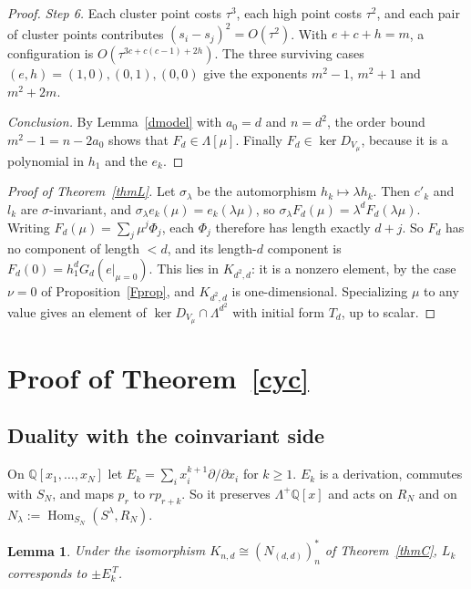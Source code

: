 \documentclass[11pt]{article}
\newtheorem{lemma}[theorem]{Lemma}
\theoremstyle{definition}
\theoremstyle{remark}
\newcommand{\Q}{\mathbb{Q}}
\newcommand{\La}{\Lambda}
\newcommand{\Hom}{\operatorname{Hom}}
\begin{document}
\begin{proof}
\emph{Step 6.} Each cluster point costs $\tau^3$, each high point costs $\tau^2$, and each pair of cluster points
contributes $(s_i-s_j)^2=O(\tau^2)$. With $e+c+h=m$, a configuration is $O(\tau^{3c+c(c-1)+2h})$. The three
surviving cases $(e,h)=(1,0),(0,1),(0,0)$ give the exponents $m^2-1$, $m^2+1$ and $m^2+2m$.

\emph{Conclusion.} By Lemma~\ref{dmodel} with $a_0=d$ and $n=d^2$, the order bound $m^2-1=n-2a_0$ shows that
$F_d\in\La[\mu]$. Finally $F_d\in\ker D_{V_\mu}$, because it is a polynomial in $h_1$ and the $e_k$.
\end{proof}

\begin{proof}[Proof of Theorem~\ref{thmL}]
Let $\sigma_\lambda$ be the automorphism $h_k\mapsto\lambda h_k$. Then $c'_k$ and $l_k$ are $\sigma$-invariant, and
$\sigma_\lambda e_k(\mu)=e_k(\lambda\mu)$, so $\sigma_\lambda F_d(\mu)=\lambda^dF_d(\lambda\mu)$. Writing
$F_d(\mu)=\sum_j\mu^j\Phi_j$, each $\Phi_j$ therefore has length exactly $d+j$. So $F_d$ has no component of length
$<d$, and its length-$d$ component is $F_d(0)=h_1^dG_d(e|_{\mu=0})$. This lies in $K_{d^2,d}$: it is a nonzero
element, by the case $\nu=0$ of Proposition~\ref{Fprop}, and $K_{d^2,d}$ is one-dimensional. Specializing $\mu$ to
any value gives an element of $\ker D_{V_\mu}\cap\La^{d^2}$ with initial form $T_d$, up to scalar.
\end{proof}

\section{Proof of Theorem~\ref{cyc}}\label{sec:cyc}

\subsection{Duality with the coinvariant side}

On $\Q[x_1,\dots,x_N]$ let $E_k=\sum_ix_i^{k+1}\partial/\partial x_i$ for $k\ge1$. $E_k$ is a derivation, commutes
with $S_N$, and maps $p_r$ to $rp_{r+k}$. So it preserves $\La^+\Q[x]$ and acts on $R_N$ and on
$N_\lambda:=\Hom_{S_N}(S^\lambda,R_N)$.

\begin{lemma}\label{dual}
Under the isomorphism $K_{n,d}\cong(N_{(d,d)})_n^*$ of Theorem~\ref{thmC}, $L_k$ corresponds to $\pm E_k^{\,T}$.
\end{lemma}
\end{document}
